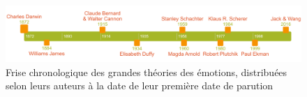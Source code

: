 \begin{figure}
  \centering
  \includegraphics[width=16cm]{./Chapitre1/figures/friseHisto.png}
  \caption{Frise chronologique des grandes théories des émotions, distribuées selon leurs auteurs à la date de leur première date de parution}
  \label{fig:friseHisto}
\end{figure}
